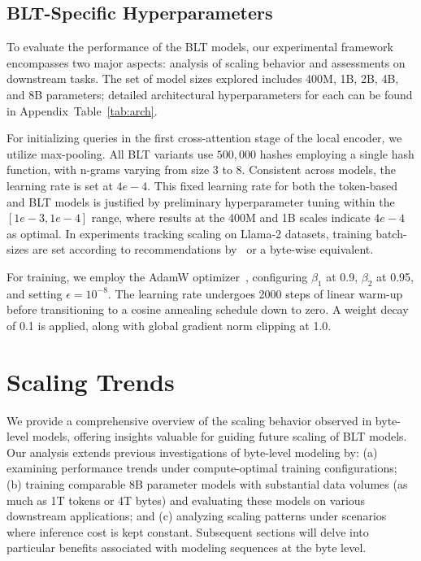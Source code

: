 \subsection{{\textsc BLT}-Specific Hyperparameters}

To evaluate the performance of the {\textsc BLT} models, our experimental framework encompasses two major aspects: analysis of scaling behavior and assessments on downstream tasks. The set of model sizes explored includes 400M, 1B, 2B, 4B, and 8B parameters; detailed architectural hyperparameters for each can be found in Appendix~Table~\ref{tab:arch}.

For initializing queries in the first cross-attention stage of the local encoder, we utilize max-pooling. All {\textsc BLT} variants use $500,000$ hashes employing a single hash function, with n-grams varying from size 3 to 8. Consistent across models, the learning rate is set at $4e-4$. This fixed learning rate for both the token-based and {\textsc BLT} models is justified by preliminary hyperparameter tuning within the $[1e-3, 1e-4]$ range, where results at the 400M and 1B scales indicate $4e-4$ as optimal. In experiments tracking scaling on Llama-2 datasets, training batch-sizes are set according to recommendations by~\cite{dubey2024llama} or a byte-wise equivalent.

For training, we employ the AdamW optimizer~\citep{adamw}, configuring $\beta_1$ at 0.9, $\beta_2$ at 0.95, and setting $\epsilon=10^{-8}$. The learning rate undergoes 2000 steps of linear warm-up before transitioning to a cosine annealing schedule down to zero. A weight decay of 0.1 is applied, along with global gradient norm clipping at 1.0.

\section{Scaling Trends}
\label{section:scaling}

We provide a comprehensive overview of the scaling behavior observed in byte-level models, offering insights valuable for guiding future scaling of {\textsc BLT} models. Our analysis extends previous investigations of byte-level modeling by: (a) examining performance trends under compute-optimal training configurations; (b) training comparable 8B parameter models with substantial data volumes (as much as 1T tokens or 4T bytes) and evaluating these models on various downstream applications; and (c) analyzing scaling patterns under scenarios where inference cost is kept constant. Subsequent sections will delve into particular benefits associated with modeling sequences at the byte level.

